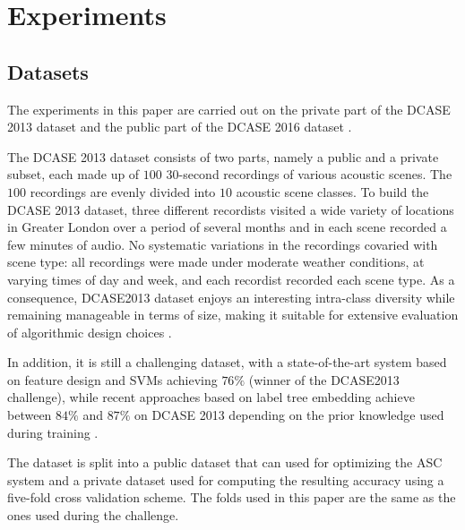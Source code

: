 \documentclass[journal]{IEEEtran}
\begin{document}
\section{Experiments}
\label{sec:experiments}

\subsection{Datasets}

The experiments in this paper are carried out on the private part of the DCASE 2013 dataset\cite{7100934} and the public part of the DCASE 2016 dataset \cite{Mesaros2016_EUSIPCO}.

The DCASE 2013 dataset consists of two parts, namely a public and a private subset, each made up of $100$ $30$-second recordings of various acoustic scenes. The $100$ recordings are evenly divided into $10$ acoustic scene classes. To build the DCASE 2013 dataset, three different recordists visited a wide variety of locations in Greater London over a period of several months and in each scene recorded a few minutes of audio. No
systematic variations in the recordings covaried with scene
type: all recordings were made under moderate weather conditions, at varying times of day and week, and each recordist recorded each scene type. As a consequence, DCASE2013 dataset enjoys an interesting intra-class diversity while remaining manageable in terms of size, making it suitable for extensive evaluation of algorithmic design choices \cite{lagrange:hal-01082501}. 

In addition, it is still a challenging dataset, with a state-of-the-art system based on feature design and SVMs achieving $76\%$ \cite{roma2013} (winner of the DCASE2013 challenge), while recent approaches based on label tree embedding achieve between $84\%$ and $87\%$ on DCASE 2013 depending on the prior knowledge used during training \cite{phan2016label}.


The dataset is split into a public dataset that can used for optimizing the ASC system and a private dataset used for computing the resulting accuracy using a five-fold cross validation scheme. The folds used in this paper are the same as the ones used during the challenge.
\end{document}
